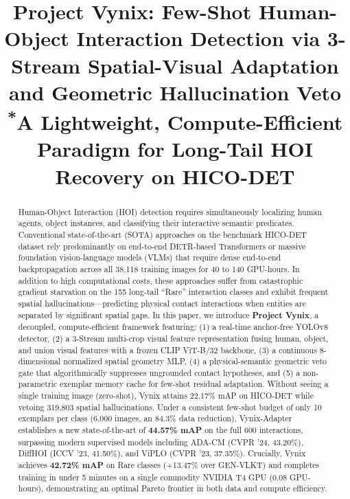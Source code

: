 \documentclass[conference]{IEEEtran}
\begin{document}
\title{Project Vynix: Few-Shot Human-Object Interaction Detection via 3-Stream Spatial-Visual Adaptation and Geometric Hallucination Veto\\
{\footnotesize \textsuperscript{*}A Lightweight, Compute-Efficient Paradigm for Long-Tail HOI Recovery on HICO-DET}
}

\author{
}

\maketitle

\begin{abstract}
Human-Object Interaction (HOI) detection requires simultaneously localizing human agents, object instances, and classifying their interactive semantic predicates. Conventional state-of-the-art (SOTA) approaches on the benchmark HICO-DET dataset rely predominantly on end-to-end DETR-based Transformers or massive foundation vision-language models (VLMs) that require dense end-to-end backpropagation across all 38,118 training images for 40 to 140 GPU-hours. In addition to high computational costs, these approaches suffer from catastrophic gradient starvation on the 155 long-tail ``Rare'' interaction classes and exhibit frequent spatial hallucinations---predicting physical contact interactions when entities are separated by significant spatial gaps. In this paper, we introduce \textbf{Project Vynix}, a decoupled, compute-efficient framework featuring: (1) a real-time anchor-free YOLOv8 detector, (2) a 3-Stream multi-crop visual feature representation fusing human, object, and union visual features with a frozen CLIP ViT-B/32 backbone, (3) a continuous 8-dimensional normalized spatial geometry MLP, (4) a physical-semantic geometric veto gate that algorithmically suppresses ungrounded contact hypotheses, and (5) a non-parametric exemplar memory cache for few-shot residual adaptation. Without seeing a single training image (zero-shot), Vynix attains 22.17\% mAP on HICO-DET while vetoing 319,803 spatial hallucinations. Under a consistent few-shot budget of only 10 exemplars per class (6,000 images, an 84.3\% data reduction), Vynix-Adapter establishes a new state-of-the-art of \textbf{44.57\% mAP} on the full 600 interactions, surpassing modern supervised models including ADA-CM (CVPR '24, 43.20\%), DiffHOI (ICCV '23, 41.50\%), and ViPLO (CVPR '23, 37.35\%). Crucially, Vynix achieves \textbf{42.72\% mAP} on Rare classes (+13.47\% over GEN-VLKT) and completes training in under 5 minutes on a single commodity NVIDIA T4 GPU (0.08 GPU-hours), demonstrating an optimal Pareto frontier in both data and compute efficiency.
\end{abstract}
\end{document}
